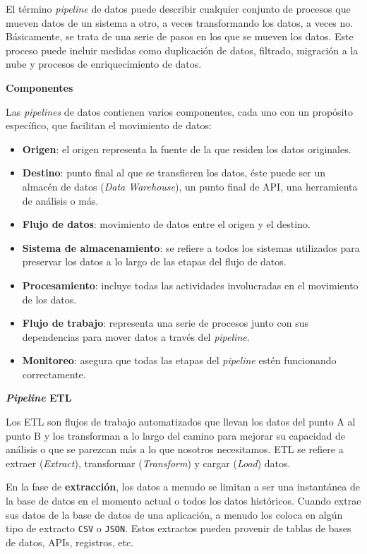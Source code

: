 \documentclass[a4paper,12pt]{article}
\begin{document}
		El término \textit{pipeline} de datos puede describir cualquier conjunto de procesos que mueven datos de un sistema a otro, a veces transformando los datos, a veces no. Básicamente, se trata de una serie de pasos en los que se mueven los datos. Este proceso puede incluir medidas como duplicación de datos, filtrado, migración a la nube y procesos de enriquecimiento de datos. \citep{Tobin2020Jun}
				
		\textbf{Componentes}
				
		Las \textit{pipelines} de datos contienen varios componentes, cada uno con un propósito específico, que facilitan el movimiento de datos:
		\begin{itemize}[noitemsep, topsep=2pt]
			\item \textbf{Origen}: el origen representa la fuente de la que residen los datos originales.
			\item \textbf{Destino}: punto final al que se transfieren los datos, éste puede ser un almacén de datos (\textit{Data Warehouse}), un punto final de API, una herramienta de análisis o más.
			\item \textbf{Flujo de datos}: movimiento de datos entre el origen y el destino.
			\item \textbf{Sistema de almacenamiento}: se refiere a todos los sistemas utilizados para preservar los datos a lo largo de las etapas del flujo de datos.
			\item \textbf{Procesamiento}: incluye todas las actividades involucradas en el movimiento de los datos.
			\item \textbf{Flujo de trabajo}: representa una serie de procesos junto con sus dependencias para mover datos a través del \textit{pipeline}.
			\item \textbf{Monitoreo}: asegura que todas las etapas del \textit{pipeline} estén funcionando correctamente.
		\end{itemize}
				
		\textbf{\textit{Pipeline} ETL}
				
		Los ETL son flujos de trabajo automatizados que llevan los datos del punto A al punto B y los transforman a lo largo del camino para mejorar su capacidad de análisis o que se parezcan más a lo que nosotros necesitamos. ETL se refiere a extraer (\textit{Extract}), transformar (\textit{Transform}) y cargar (\textit{Load}) datos. \citep{SeattleDataGuy}
				
		En la fase de \textbf{extracción}, los datos a menudo se limitan a ser una instantánea de la base de datos en el momento actual o todos los datos históricos. Cuando extrae sus datos de la base de datos de una aplicación, a menudo los coloca en algún tipo de extracto \texttt{CSV} o \texttt{JSON}. Estos extractos pueden provenir de tablas de bases de datos, APIs, registros, etc.
				
\end{document}
